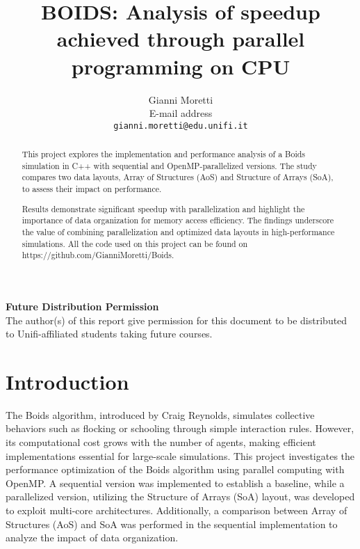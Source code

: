 \documentclass[10pt,twocolumn,letterpaper]{article}
\begin{document}
\title{BOIDS: Analysis of speedup achieved through parallel programming on CPU}

\author{Gianni Moretti\\
E-mail address\\
{\tt\small gianni.moretti@edu.unifi.it}
}

\maketitle
\thispagestyle{empty}

\begin{abstract}
This project explores the implementation and performance analysis of a Boids simulation in C++ with sequential and OpenMP-parallelized versions. The study compares two data layouts, Array of Structures (AoS) and Structure of Arrays (SoA), to assess their impact on performance.

Results demonstrate significant speedup with parallelization and highlight the importance of data organization for memory access efficiency. The findings underscore the value of combining parallelization and optimized data layouts in high-performance simulations. All the code used on this project can be found on https://github.com/GianniMoretti/Boids.
\end{abstract}

\noindent\large\textbf{Future Distribution Permission}\\
\indent The author(s) of this report give permission for this document to be distributed to Unifi-affiliated students taking future courses.

\section{Introduction}
The Boids algorithm, introduced by Craig Reynolds, simulates collective behaviors such as flocking or schooling through simple interaction rules. However, its computational cost grows with the number of agents, making efficient implementations essential for large-scale simulations.
This project investigates the performance optimization of the Boids algorithm using parallel computing with OpenMP. A sequential version was implemented to establish a baseline, while a parallelized version, utilizing the Structure of Arrays (SoA) layout, was developed to exploit multi-core architectures. Additionally, a comparison between Array of Structures (AoS) and SoA was performed in the sequential implementation to analyze the impact of data organization.
\end{document}
